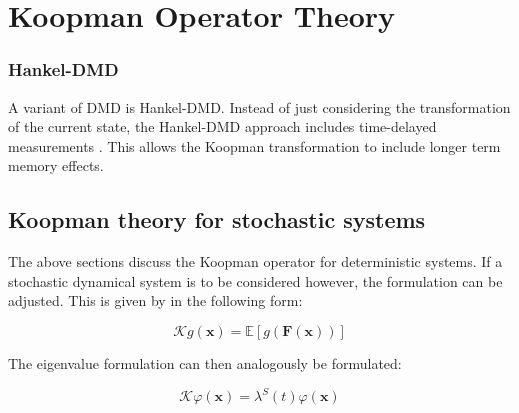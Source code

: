 \section{Koopman Operator Theory}















\subsubsection{Hankel-DMD}
A variant of DMD is Hankel-DMD. Instead of just considering the transformation of the current state, the Hankel-DMD
approach includes time-delayed measurements \parencite{bruntonDataDrivenDynamicalSystems2019}. This allows the Koopman transformation to include longer term memory
effects. 




\subsection{Koopman theory for stochastic systems}
The above sections discuss the Koopman operator for deterministic systems. If a stochastic dynamical system is to be
considered however, the formulation can be adjusted. This is given by \textcite{crnjaric-zicKoopmanOperatorSpectrum2020}
in the following form: 

\begin{equation}
    \mathcal{K}g(\mathbf{x}) = \mathbb{E}[g(\mathbf{F}(\mathbf{x}))]
\end{equation}


The eigenvalue formulation can then analogously be formulated:

\begin{equation}
    \mathcal{K}\varphi(\mathbf{x}) = \lambda^S(t)\varphi(\mathbf{x})
\end{equation}

